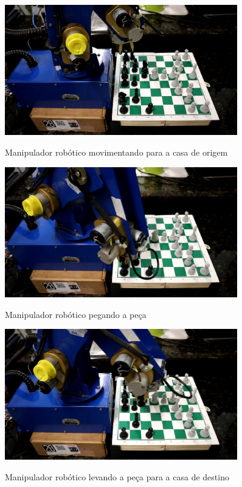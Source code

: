 \begin{figure}[H]
    \centering
    \caption{Manipulador robótico movimentando para a casa de origem}
    \includegraphics[keepaspectratio=true, width=0.9\textwidth]
    	{img/movimentando-posicao.png}
    \label{fig:manipuladorMovimentandoPosicao}
\end{figure}

\begin{figure}[H]
    \centering
    \caption{Manipulador robótico pegando a peça}
    \includegraphics[keepaspectratio=true, width=0.9\textwidth]
    	{img/pegando-peca.png}
    \label{fig:manipuladorPegandoPeça}
\end{figure}

\begin{figure}[H]
    \centering
    \caption{Manipulador robótico levando a peça para a casa de destino}
    \includegraphics[keepaspectratio=true, width=0.9\textwidth]
    	{img/levando-peca.png}
    \label{fig:manipuladorLevandoPeça}
\end{figure}


